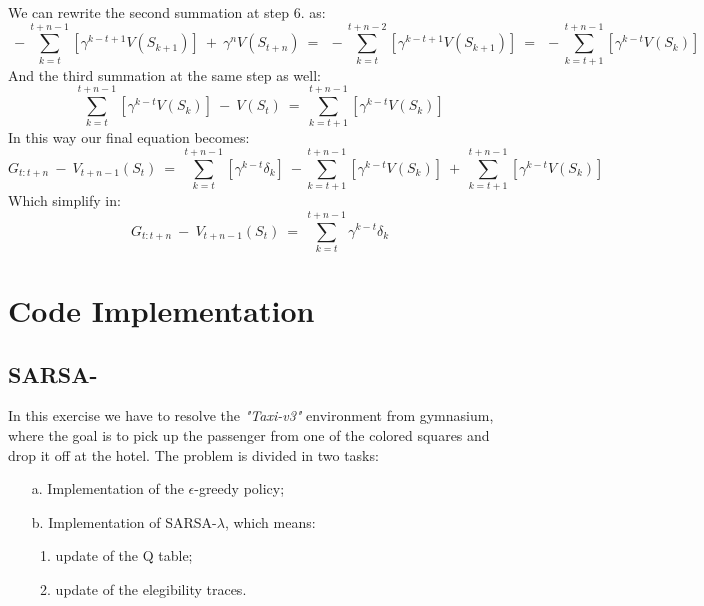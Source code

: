\documentclass[10pt,a4paper]{article}
\begin{document}
\noindent We can rewrite the second summation at step 6. as: 
\begin{equation*}
    \:-\sum_{k=t}^{t+n-1} [\gamma^{k-t+1} V(S_{k+1})] \:+\: \gamma^{n}V(S_{t+n}) \:=\: \:-\sum_{k=t}^{t+n-2} [\gamma^{k-t+1} V(S_{k+1})] \:=\: \:-\sum_{k=t+1}^{t+n-1} [\gamma^{k-t}V(S_k)]
\end{equation*}
\vspace{5pt}
And the third summation at the same step as well:
\begin{equation*}
    \sum_{k=t}^{t+n-1} [\gamma^{k-t}V(S_k)] \:-\: V(S_t) \:=\: \sum_{k=t+1}^{t+n-1} [\gamma^{k-t}V(S_k)]
\end{equation*}
\vspace{5pt}
In this way our final equation becomes:
\begin{equation*}
    G_{t:t+n} \:-\: V_{t+n-1}(S_t) \:=\: \sum_{k=t}^{t+n-1} [\gamma^{k-t}\delta_k] \:-\sum_{k=t+1}^{t+n-1} [\gamma^{k-t}V(S_k)] \:+\: \sum_{k=t+1}^{t+n-1} [\gamma^{k-t}V(S_k)]
\end{equation*}
\vspace{5pt}
Which simplify in:
\begin{equation*}
    G_{t:t+n} \:-\: V_{t+n-1}(S_t) \:=\: \sum_{k=t}^{t+n-1} \gamma^{k-t}\delta_k
\end{equation*}

\newpage
\section{Code Implementation}

\subsection{SARSA-\textlambda{}}
In this exercise we have to resolve the \textit{"Taxi-v3"} environment from gymnasium, where the goal is to pick up the passenger from one of the colored squares and drop it off at the hotel. The problem is divided in two tasks:
\begin{itemize}
    \item[a.] Implementation of the $\epsilon$-greedy policy;
    \item[b.] Implementation of SARSA-$\lambda$, which means:
    \begin{enumerate}
        \item update of the Q table;
        \item update of the elegibility traces.
    \end{enumerate}
\end{itemize}
\vspace{5pt}
\end{document}
